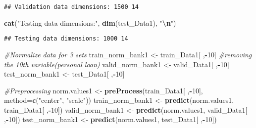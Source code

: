 \documentclass[
]{article}
\newenvironment{Shaded}{\begin{snugshade}}{\end{snugshade}}
\newcommand{\AttributeTok}[1]{\textcolor[rgb]{0.13,0.29,0.53}{#1}}
\newcommand{\CommentTok}[1]{\textcolor[rgb]{0.56,0.35,0.01}{\textit{#1}}}
\newcommand{\DecValTok}[1]{\textcolor[rgb]{0.00,0.00,0.81}{#1}}
\newcommand{\FunctionTok}[1]{\textcolor[rgb]{0.13,0.29,0.53}{\textbf{#1}}}
\newcommand{\NormalTok}[1]{#1}
\newcommand{\OtherTok}[1]{\textcolor[rgb]{0.56,0.35,0.01}{#1}}
\newcommand{\SpecialCharTok}[1]{\textcolor[rgb]{0.81,0.36,0.00}{\textbf{#1}}}
\newcommand{\StringTok}[1]{\textcolor[rgb]{0.31,0.60,0.02}{#1}}
\begin{document}
\begin{verbatim}
## Validation data dimensions: 1500 14
\end{verbatim}

\begin{Shaded}
\begin{Highlighting}[]
\FunctionTok{cat}\NormalTok{(}\StringTok{"Testing data dimensions:"}\NormalTok{, }\FunctionTok{dim}\NormalTok{(test\_Data1), }\StringTok{"}\SpecialCharTok{\textbackslash{}n}\StringTok{"}\NormalTok{)}
\end{Highlighting}
\end{Shaded}

\begin{verbatim}
## Testing data dimensions: 1000 14
\end{verbatim}

\begin{Shaded}
\begin{Highlighting}[]
\CommentTok{\#Normalize data for 3 sets}
\NormalTok{train\_norm\_bank1 }\OtherTok{\textless{}{-}}\NormalTok{ train\_Data1[ ,}\SpecialCharTok{{-}}\DecValTok{10}\NormalTok{] }\CommentTok{\#removing the 10th variable(personal loan)}
\NormalTok{valid\_norm\_bank1 }\OtherTok{\textless{}{-}}\NormalTok{ valid\_Data1[ ,}\SpecialCharTok{{-}}\DecValTok{10}\NormalTok{]}
\NormalTok{test\_norm\_bank1 }\OtherTok{\textless{}{-}}\NormalTok{ test\_Data1[ ,}\SpecialCharTok{{-}}\DecValTok{10}\NormalTok{]}

\CommentTok{\#Preprocessing}
\NormalTok{norm.values1 }\OtherTok{\textless{}{-}} \FunctionTok{preProcess}\NormalTok{(train\_Data1[ ,}\SpecialCharTok{{-}}\DecValTok{10}\NormalTok{], }\AttributeTok{method=}\FunctionTok{c}\NormalTok{(}\StringTok{"center"}\NormalTok{, }\StringTok{"scale"}\NormalTok{))}
\NormalTok{train\_norm\_bank1 }\OtherTok{\textless{}{-}} \FunctionTok{predict}\NormalTok{(norm.values1, train\_Data1[ ,}\SpecialCharTok{{-}}\DecValTok{10}\NormalTok{])}
\NormalTok{valid\_norm\_bank1 }\OtherTok{\textless{}{-}} \FunctionTok{predict}\NormalTok{(norm.values1, valid\_Data1[ ,}\SpecialCharTok{{-}}\DecValTok{10}\NormalTok{])}
\NormalTok{test\_norm\_bank1 }\OtherTok{\textless{}{-}} \FunctionTok{predict}\NormalTok{(norm.values1, test\_Data1[ ,}\SpecialCharTok{{-}}\DecValTok{10}\NormalTok{])}
\end{Highlighting}
\end{Shaded}
\end{document}
